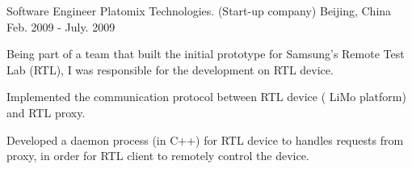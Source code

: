 \begin{cventries}
  \cventry
    {Software Engineer} %
    {Platomix Technologies. (Start-up company)} %
    {Beijing, China} %
    {Feb. 2009 - July. 2009} %
    {
      \begin{cvitems} %
        \item {Being part of a team that built the initial prototype for
    Samsung's Remote Test Lab (RTL), I was responsible for the
    development on RTL device.}
       \item {Implemented the communication protocol between RTL device (
    LiMo platform) and RTL proxy.}
       \item {Developed a daemon process (in C++) for RTL
    device to handles requests from proxy, in order for RTL client
    to remotely control the device.}
      \end{cvitems}
    }

\end{cventries}
